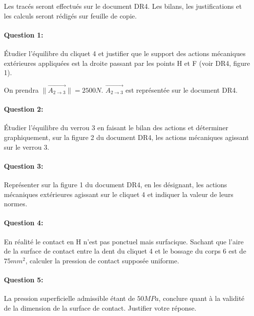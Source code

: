 Les tracés seront effectués sur le document DR4. Les bilans, les justifications et les calculs seront rédigés sur feuille de copie. 

\paragraph{Question 1:} Étudier l'équilibre du cliquet 4 et justifier que le support des actions mécaniques extérieures appliquées est la droite passant par les points H et F (voir DR4, figure 1). 

On prendra $\|\overrightarrow{A_{2 \rightarrow 3}}\|= 2500 N$. $\overrightarrow{A_{2 \rightarrow 3}}$ est représentée sur le document DR4. 

\paragraph{Question 2:} Étudier l'équilibre du verrou 3 en faisant le bilan des actions et déterminer graphiquement, sur la figure 2 du document DR4, les actions mécaniques agissant sur le verrou 3.  

\paragraph{Question 3:} Représenter sur la figure 1 du document DR4, en les désignant, les actions mécaniques extérieures agissant sur le cliquet 4 et indiquer la valeur de leurs normes. 

\paragraph{Question 4:} En réalité le contact en H n'est pas ponctuel mais surfacique. Sachant que l'aire de la surface de contact entre la dent du cliquet 4 et le bossage du corps 6 est de $75 mm^2$, calculer la pression de contact supposée uniforme.

\paragraph{Question 5:} La pression superficielle admissible étant de $50 MPa$, conclure quant à la validité de la dimension de la surface de contact. Justifier votre réponse. 





\ifdef{\public}{}{}

\clearpage

